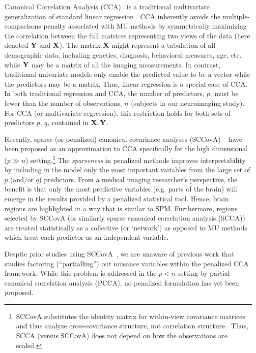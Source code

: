 \documentclass{llncs}
\newcommand{\X}{{\bf X}}
\newcommand{\Y}{{\bf Y}}
\begin{document}
Canonical Correlation Analysis (CCA)~\cite{hotellingcca} is a
traditional multivariate generalization of standard linear regression
\cite{kshirsagar}.  CCA inherently avoids the multiple-comparisons penalty
associated with MU methods by symmetrically maximizing the correlation
between the full matrices representing two views of the data (here
denoted $\Y$ and $\X$).  The matrix {$\X$} might represent a
tabulation of all demographic data, including genetics, diagnosis,
behavioral measures, age, etc. while $\Y$ may be a matrix of all the
imaging measurements.  In contrast, traditional univariate models only
enable the predicted value to be a vector while the predictors may be
a matrix.  Thus, linear regression is a special case of CCA.  In both
traditional regression and CCA, the number of predictors, $p$, must be
fewer than the number of observations, $n$ (subjects in our
neuroimaging study).  For CCA (or multivariate regression), this
restriction holds for both sets of predictors $p$, $q$, contained in
$\X, \Y$.

Recently, sparse (or penalized) canonical covariance analyses (SCCovA)
~\cite{parkhomenko,witten,lykou} have been proposed as an
approximation to CCA specifically for the high dimensional ($p\gg n$)
setting.\footnote{SCCovA substitutes the identity matrix for
within-view covariance matrices and thus analyze cross-covariance
structure, not correlation structure \cite{cherry}.  Thus, SCCA
(versus SCCovA) does not depend on how the observations are scaled.}
The {\em sparseness} in penalized methods improves interpretability by
including in the model only the most important variables from the
large set of $p$ (and/or $q$) predictors.  From a medical imaging
researcher's perspective, the benefit is that only the most predictive
variables (e.g. parts of the brain) will emerge in the results
provided by a penalized statistical tool.  Hence, brain regions are
highlighted in a way that is similar to SPM.  Furthermore, regions
selected by SCCovA (or similarly sparse canonical correlation analysis
(SCCA)) are treated statistically as a collective (or `network') as
opposed to MU methods which treat each predictor as an independent
variable.

Despite prior studies using SCCovA~\cite{parkhomenko,witten,lykou,Avants2010b}, we are unaware of
previous work that studies factoring (``partialling'') out nuisance
variables within the penalized CCA framework.  While this problem is
addressed in the $p < n$ setting by partial canonical correlation
analysis (PCCA)\cite{timm}, no penalized formulation has yet been
proposed.
\end{document}
